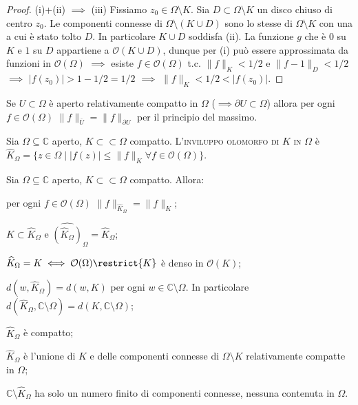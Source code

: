 \begin{proof}
  (i)+(ii) $\implies$ (iii) Fissiamo $z_0 \in \Omega \setminus K$. Sia $D \subset \Omega \setminus K$ un disco chiuso di centro $z_0$. Le componenti connesse di $\Omega \setminus (K \cup D)$ sono lo stesse di $\Omega \setminus K$ con una a cui è stato tolto $D$. In particolare $K \cup D$ soddisfa (ii).
  La funzione $g$ che è $0$ su $K$ e $1$ su $D$ appartiene a $\mathcal{O}(K \cup D)$, dunque per (i) può essere approssimata da funzioni in $\mathcal{O}(\Omega)$ $\implies$ esiste $f \in \mathcal{O}(\Omega)$ t.c. $\|f\|_K<1/2$ e $\|f-1\|_D<1/2$ $\implies$ $|f(z_0)|>1-1/2=1/2$ $\implies$ $\|f\|_K<1/2<|f(z_0)|$.
\end{proof}

\begin{oss}
  Se $U \subset \Omega$ è aperto relativamente compatto in $\Omega$ ($\implies \partial U\subset \Omega$) allora per ogni $f \in \mathcal{O}(\Omega)$ $\|f\|_{\overline{U}}=\|f\|_{\partial U}$ per il principio del massimo.
\end{oss}

\begin{defn}
  Sia $\Omega \subseteq \mathbb{C}$ aperto, $K\subset\subset\Omega$ compatto. L'\textsc{inviluppo olomorfo di $K$ in $\Omega$} è $\widehat{K}_{\Omega}=\{z \in \Omega \mid |f(z)|\le\|f\|_K\forall f \in \mathcal{O}(\Omega)\}$.
\end{defn}

\begin{prop} \label{inviluppo}
  Sia $\Omega \subseteq \mathbb{C}$ aperto, $K\subset\subset\Omega$ compatto. Allora:
  \begin{nlist}
    \item per ogni $f \in \mathcal{O}(\Omega)$ $\|f\|_{\widehat{K}_{\Omega}}=\|f\|_K$;
    \item $K \subset \widehat{K}_{\Omega}$ e $\widehat{(\widehat{K}_\Omega)}_{\Omega}=\widehat{K}_{\Omega}$;
    \item $\widehat{K}_{\Omega}=K \iff \mathcal{O}(\Omega)\restrict{K}$ è denso in $\mathcal{O}(K)$;
    \item $d(w, \widehat{K}_{\Omega})=d(w, K)$ per ogni $w \in \mathbb{C}\setminus\Omega$. In particolare $d(\widehat{K}_{\Omega}, \mathbb{C}\setminus\Omega)=d(K, \mathbb{C}\setminus\Omega)$;
    \item $\widehat{K}_{\Omega}$ è compatto;
    \item $\widehat{K}_{\Omega}$ è l'unione di $K$ e delle componenti connesse di $\Omega \setminus K$ relativamente compatte in $\Omega$;
    \item $\mathbb{C}\setminus \widehat{K}_{\Omega}$ ha solo un numero finito di componenti connesse, nessuna contenuta in $\Omega$.
  \end{nlist}
\end{prop}

